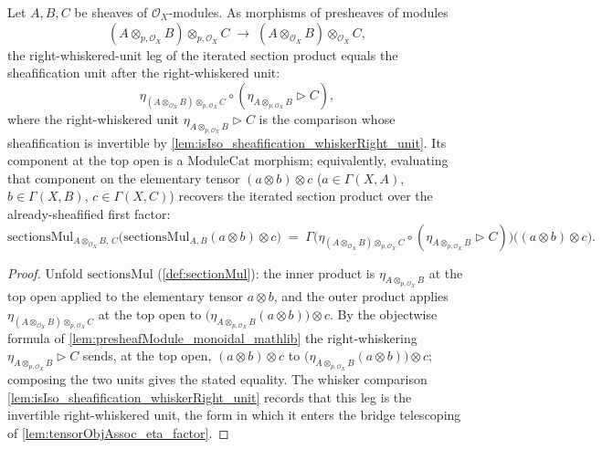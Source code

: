 \begin{lemma}

  \label{lem:sectionsMul_whiskerRight_unit}
  Let \(A, B, C\) be sheaves of \(\mathcal{O}_X\)-modules. As morphisms of
  presheaves of modules
  \[
    (A \otimes_{p,\mathcal{O}_X} B) \otimes_{p,\mathcal{O}_X} C
      \;\longrightarrow\;
    (A \otimes_{\mathcal{O}_X} B) \otimes_{\mathcal{O}_X} C,
  \]
  the right-whiskered-unit leg of the iterated section product equals the
  sheafification unit after the right-whiskered unit:
  \[
    \eta_{(A \otimes_{\mathcal{O}_X} B) \otimes_{p,\mathcal{O}_X} C}
      \circ (\eta_{A \otimes_{p,\mathcal{O}_X} B} \rhd C),
  \]
  where the right-whiskered unit \(\eta_{A \otimes_{p,\mathcal{O}_X} B} \rhd C\) is
  the comparison whose sheafification is invertible by
  \cref{lem:isIso_sheafification_whiskerRight_unit}. Its component at the top open is a \(\mathrm{ModuleCat}\)
  morphism; equivalently, evaluating that component on the elementary tensor
  \((a \otimes b) \otimes c\) (\(a \in \Gamma(X,A)\), \(b \in \Gamma(X,B)\),
  \(c \in \Gamma(X,C)\)) recovers the iterated section product over the
  already-sheafified first factor:
  \[
    \mathrm{sectionsMul}_{A \otimes_{\mathcal{O}_X} B,\, C}\bigl(
      \mathrm{sectionsMul}_{A,B}(a \otimes b) \otimes c\bigr)
    \;=\;
    \Gamma\bigl(
      \eta_{(A \otimes_{\mathcal{O}_X} B) \otimes_{p,\mathcal{O}_X} C}
        \circ (\eta_{A \otimes_{p,\mathcal{O}_X} B} \rhd C)
    \bigr)\bigl((a \otimes b) \otimes c\bigr).
  \]
\end{lemma}

\begin{proof}
  \leanok
  Unfold \(\mathrm{sectionsMul}\) (\cref{def:sectionMul}): the inner product is
  \(\eta_{A \otimes_{p,\mathcal{O}_X} B}\) at the top open applied to the elementary
  tensor \(a \otimes b\), and the outer product applies
  \(\eta_{(A \otimes_{\mathcal{O}_X} B) \otimes_{p,\mathcal{O}_X} C}\) at the top
  open to \(\bigl(\eta_{A \otimes_{p,\mathcal{O}_X} B}(a \otimes b)\bigr) \otimes c\).
  By the objectwise formula of \cref{lem:presheafModule_monoidal_mathlib} the
  right-whiskering \(\eta_{A \otimes_{p,\mathcal{O}_X} B} \rhd C\) sends, at the top
  open, \((a \otimes b) \otimes c\) to
  \(\bigl(\eta_{A \otimes_{p,\mathcal{O}_X} B}(a \otimes b)\bigr) \otimes c\);
  composing the two units gives the stated equality. The whisker comparison
  \cref{lem:isIso_sheafification_whiskerRight_unit} records that this leg is the
  invertible right-whiskered unit, the form in which it enters the bridge
  telescoping of \cref{lem:tensorObjAssoc_eta_factor}.
\end{proof}

